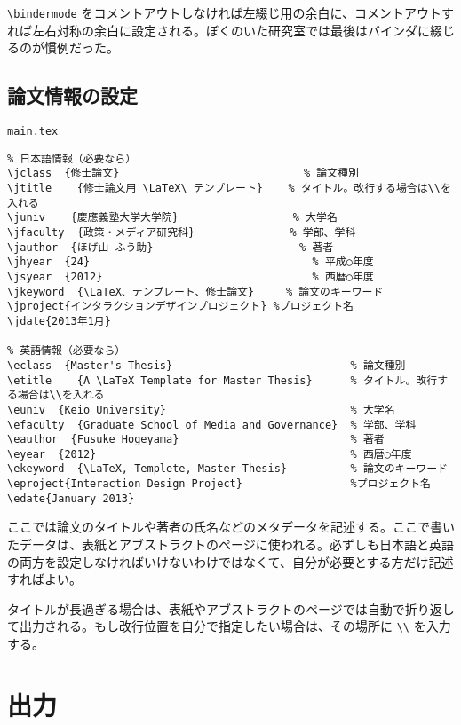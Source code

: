 \verb|\bindermode| をコメントアウトしなければ左綴じ用の余白に、コメントアウトすれば左右対称の余白に設定される。ぼくのいた研究室では最後はバインダに綴じるのが慣例だった。


\subsection{論文情報の設定}
\label{sec:meta}

\begin{itembox}[l]{{\tt main.tex}}
\begin{verbatim}
% 日本語情報（必要なら）
\jclass  {修士論文}                             % 論文種別
\jtitle    {修士論文用 \LaTeX\ テンプレート}    % タイトル。改行する場合は\\を入れる
\juniv    {慶應義塾大学大学院}                  % 大学名
\jfaculty  {政策・メディア研究科}               % 学部、学科
\jauthor  {ほげ山 ふう助}                       % 著者
\jhyear  {24}                                   % 平成○年度
\jsyear  {2012}                                 % 西暦○年度
\jkeyword  {\LaTeX、テンプレート、修士論文}     % 論文のキーワード
\jproject{インタラクションデザインプロジェクト} %プロジェクト名
\jdate{2013年1月}

% 英語情報（必要なら）
\eclass  {Master's Thesis}                            % 論文種別
\etitle    {A \LaTeX Template for Master Thesis}      % タイトル。改行する場合は\\を入れる
\euniv  {Keio University}                             % 大学名
\efaculty  {Graduate School of Media and Governance}  % 学部、学科
\eauthor  {Fusuke Hogeyama}                           % 著者
\eyear  {2012}                                        % 西暦○年度
\ekeyword  {\LaTeX, Templete, Master Thesis}          % 論文のキーワード
\eproject{Interaction Design Project}                 %プロジェクト名
\edate{January 2013}
\end{verbatim}
\end{itembox}

ここでは論文のタイトルや著者の氏名などのメタデータを記述する。ここで書いたデータは、表紙とアブストラクトのページに使われる。必ずしも日本語と英語の両方を設定しなければいけないわけではなくて、自分が必要とする方だけ記述すればよい。

タイトルが長過ぎる場合は、表紙やアブストラクトのページでは自動で折り返して出力される。もし改行位置を自分で指定したい場合は、その場所に \verb|\\| を入力する。


\section{出力}

